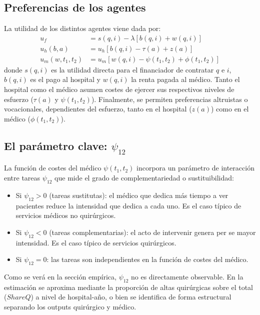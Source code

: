 \subsection{Preferencias de los agentes}

La utilidad de los distintos agentes viene dada por:
\begin{align}
    u_f &= s(q,i)-\lambda[b(q,i)+w(q,i)] \label{eq:util_f}\\
    u_h(b,a) &= u_h[b(q,i)-\tau(a)+z(a)] \label{eq:util_h}\\
    u_m(w,t_1,t_2) &= u_m[w(q,i)-\psi(t_1,t_2)+\phi(t_1,t_2)] \label{eq:util_m}
\end{align}
donde $s(q,i)$ es la utilidad directa para el financiador de contratar $q$ e $i$, $b(q,i)$ es el pago al hospital y $w(q,i)$ la renta pagada al médico. Tanto el hospital como el médico asumen costes de ejercer sus respectivos niveles de esfuerzo ($\tau(a)$ y $\psi(t_1,t_2)$). Finalmente, se permiten preferencias altruistas o vocacionales, dependientes del esfuerzo, tanto en el hospital ($z(a)$) como en el médico ($\phi(t_1,t_2)$).

\subsection{El parámetro clave: \texorpdfstring{$\psi_{12}$}{psi\_12}}

La función de costes del médico $\psi(t_1,t_2)$ incorpora un parámetro de interacción entre tareas $\psi_{12}$ que mide el grado de complementariedad o sustituibilidad:
\begin{itemize}[leftmargin=2cm]
  \item Si $\psi_{12} > 0$ (tareas sustitutas): el médico que dedica más tiempo a ver pacientes reduce la intensidad que dedica a cada uno. Es el caso típico de servicios médicos no quirúrgicos.
  \item Si $\psi_{12} < 0$ (tareas complementarias): el acto de intervenir genera per se mayor intensidad. Es el caso típico de servicios quirúrgicos.
  \item Si $\psi_{12} = 0$: las tareas son independientes en la función de costes del médico.
\end{itemize}

Como se verá en la sección empírica, $\psi_{12}$ no es directamente observable. En la estimación se aproxima mediante la proporción de altas quirúrgicas sobre el total ($ShareQ$) a nivel de hospital-año, o bien se identifica de forma estructural separando los outputs quirúrgico y médico.


